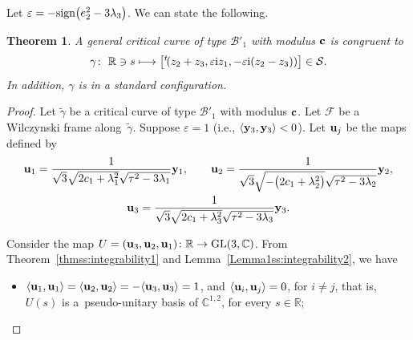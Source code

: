 \documentclass[10pt,a4paper]{amsart}
\numberwithin{equation}{section}
\newtheorem{thmx}{Theorem} %
\def\C{\mathbb{C}}
\def\R{\mathbb{R}}
\def\S{\mathcal{S}}
\def\S{\mathcal{S}}
\begin{document}
Let $\varepsilon =-{\rm sign}\big(e_2^2-3\lambda_3\big)$.
%
We can state the following.

\begin{thmx} \label{Theorem1ss:integrability2} %
A general critical curve of type ${\mathcal B}'_1$ with modulus ${\bf c}$ is congruent to
\begin{equation}\label{standard}
\gamma\colon \ \R \ni s \longmapsto \big[{^t\!(}z_2+z_3,\varepsilon {\rm i}z_1,-\varepsilon {\rm i}(z_2-z_3))\big]\in \S.\end{equation}
In addition, $\gamma$ is in a standard configuration.
\end{thmx}

\begin{proof}
Let $\widetilde{\gamma}$ be a critical curve of type ${\mathcal B}'_1$ with modulus ${\bf c}$. Let ${\mathcal F}$ be
a
Wilczynski frame along~$\widetilde{\gamma}$. Suppose $\varepsilon =1$ (i.e., $\langle {\bf y}_3,{\bf y}_3\rangle<0$).
Let ${\bf u}_j$ be the maps defined by
 \begin{gather*}
{\bf u}_1=\frac{1}{\sqrt{3}\sqrt{2c_1+\lambda_1^2}\sqrt{\tau^2-3\lambda_1}}{\bf y}_1,\qquad
{\bf u}_2=\frac{1}{\sqrt{3}\sqrt{-\big(2c_1+\lambda_2^2\big)}\sqrt{\tau^2-3\lambda_2}}{\bf y}_2,\\
{\bf u}_3=\frac{1}{\sqrt{3}\sqrt{2c_1+\lambda_3^2}\sqrt{\tau^2-3\lambda_3}}{\bf y}_3.
\end{gather*}

Consider the map
${U}=({\bf u}_3,{\bf u}_2, {\bf u}_1)\colon\R\to {\rm GL}(3,\C)$.
From Theorem~\ref{thmss:integrability1}
and Lemma~\ref{Lemma1ss:integrability2}, we have
\begin{itemize}\itemsep=0pt
\item $\langle {\bf u}_1,{\bf u}_1 \rangle= \langle {\bf u}_2,{\bf u}_2 \rangle=-\langle {\bf u}_3,{\bf u}_3 \rangle
 =1$, and $\langle {\bf u}_i,{\bf u}_j\rangle = 0$, for $i\neq j$, that is, ${U}(s)$ is a~pseudo-unitary
 basis of $\C^{1,2}$, for every $s\in \R$;


\end{itemize}
\end{proof}
\end{document}
